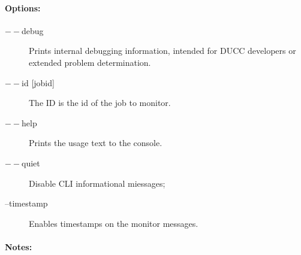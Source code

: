     \paragraph{Options:}
    \begin{description}
        \item[$--$debug ]          
          Prints internal debugging information, intended for DUCC developers or extended problem determination.
        \item[$--$id {[jobid]}]
          The ID is the id of the job to monitor.
        \item[$--$help]
          Prints the usage text to the console. 
        \item[$--$quiet] 
          Disable CLI informational miessages;
        \item[--timestamp]
          Enables timestamps on the monitor messages.
     \end{description}
        
    \paragraph{Notes:}
